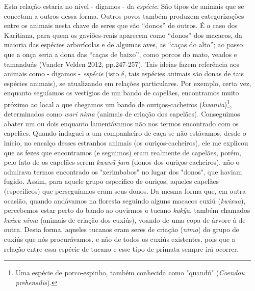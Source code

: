 Esta relação estaria no nível - digamos - da \emph{espécie}. São tipos
de animais que se conectam a outros dessa forma. Outros povos também
produzem categorizações entre os animais nesta chave de seres que são
``donos'' de outros. É o caso dos Karitiana, para quem os gaviões-reais
aparecem como ``donos'' dos macacos, da maioria das espécies arborícolas
e de algumas aves, as ``caças do alto''; ao passo que a onça seria a
dona das ``caças de baixo'', como porcos do mato, veados e tamanduás
(Vander Velden 2012, pp.247-257). Tais ideias fazem referência aos
animais como - digamos - \emph{espécie} (isto é, tais espécies animais
são donas de tais espécies animais), se atualizando em relações
particulares. Por exemplo, certa vez, enquanto seguíamos os vestígios de
um bando de capelães, encontramos muito próximo ao local a que chegamos
um bando de ouriços-cacheiros (\emph{kwanũa})\footnote{Uma espécie de
  porco-espinho, também conhecida como "quandú" (\emph{Coendou
  prehensilis}).}, determinados como \emph{wari} \emph{nima} (animais de
criação dos capelães). Conseguimos abater um ou dois enquanto
lamentávamos não nos termos encontrado com os capelães. Quando indaguei
a um companheiro de caça se não estávamos, desde o início, no encalço
desses estranhos animais (os ouriços-cacheiros), ele me explicou que as
fezes que encontramos (e seguimos) eram realmente de capelães, porém,
pelo fato de os capelães serem \emph{kwanũ} \emph{jara} (donos dos
ouriços-cacheiros), não o admirava termos encontrado os "xerimbabos" no
lugar dos "donos", que haviam fugido. Assim, para aquele grupo
específico de ouriços, aqueles capelães (específicos) que perseguíamos
eram seus donos. Da mesma forma que, em outra ocasião, quando andávamos
na floresta seguindo alguns macacos cuxiú (\emph{kwixua}), percebemos
estar perto do bando ao ouvirmos o tucano \emph{kakỹa}, também chamados
\emph{kwixu} \emph{nima} (animais de criação dos cuxiús), voando de uma
copa de árvore à de outra. Desta forma, aqueles tucanos eram seres de
criação (\emph{nima}) do grupo de cuxiús que nós procurávamos, e não de
todos os cuxiús existentes, pois que a relação entre essa espécie de
tucano e esse tipo de primata sempre irá ocorrer.

